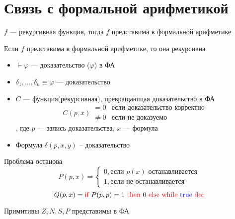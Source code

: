 \documentclass[english]{article}
\begin{document}
\section{Связь с формальной арифметикой}
\label{sec:orgf8bf09e}
\begin{theorem}
	\(f\) --- рекурсивная функция, тогда \(f\) представима в формальной арифметике
	\label{org5a67b3d}
\end{theorem}
\begin{theorem}
	Если \(f\) представима в формальной арифметике, то она рекурсивна
	\label{orgb31638b}
\end{theorem}
\begin{remark}
	\-
	\begin{itemize}
		\item \(\vdash \varphi\) --- доказательство (\(\varphi\)) в ФА
		\item \(\delta_1, \dots, \delta_n \equiv \varphi\) --- доказательство
		\item \(C\) --- функция(рекурсивная), превращающая доказательство в ФА \\
		      \[ C(p, x) \begin{matrix}
				      = 0    & \text{если доказательство корректно} \\
				      \neq 0 & \text{если не доказуемо}
			      \end{matrix} \], где \(p\) --- запись доказательства, \(x\) --- формула
		\item Формула \(\delta(p, x, y)\) -- доказательство
	\end{itemize}
\end{remark}
\todo
\begin{remark}
	Проблема останова
	\[P(p, x) = \begin{cases}
			0, \text{если }p(x)\text{ останавливается} \\
			1, \text{если не останавливается}
		\end{cases} \]
	\[ Q(p, x) = \text{\color{red}if } P(p, p) = 1 \text{ \color{red}then } 0 \text{ \color{red}else while \color{blue}true \color{red}do;}\]
\end{remark}
\begin{theorem}
	Примитивы \(Z, N, S, P\) представимы в ФА
	\label{orge1881c3}
\end{theorem}
\end{document}
